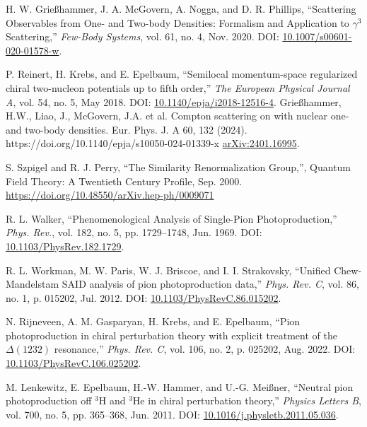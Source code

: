 \documentclass[a4paper,11pt]{article}
\begin{document}
\begin{thebibliography}{99}
  H. W. Grie{\ss}hammer, J. A. McGovern, A. Nogga, and D. R.
  Phillips, ``Scattering Observables from One- and Two-body
  Densities: Formalism and Application to $\gamma^3$ Scattering,''
  \textit{Few-Body Systems}, vol. 61, no. 4, Nov. 2020. DOI:
  \href{https://doi.org/10.1007/s00601-020-01578-w}{10.1007/s00601-020-01578-w}.

  P. Reinert, H. Krebs, and E. Epelbaum, ``Semilocal momentum-space
  regularized chiral two-nucleon potentials up to fifth order,''
  \textit{The European Physical Journal A}, vol. 54, no. 5, May 2018.
  DOI:
  \href{http://dx.doi.org/10.1140/epja/i2018-12516-4}{10.1140/epja/i2018-12516-4}.
Grießhammer, H.W., Liao, J., McGovern, J.A. et al. Compton scattering on 
 with nuclear one- and two-body densities. Eur. Phys. J. A 60, 132 (2024). https://doi.org/10.1140/epja/s10050-024-01339-x
\href{https://arxiv.org/abs/2401.16995}{arXiv:2401.16995}.

S. Szpigel and R. J. Perry, ``The Similarity Renormalization Group,'', Quantum Field Theory: A Twentieth Century Profile,
Sep. 2000. \href{https://doi.org/10.48550/arXiv.hep-ph/0009071}{https://doi.org/10.48550/arXiv.hep-ph/0009071}

R. L. Walker, ``Phenomenological Analysis of Single-Pion
Photoproduction,'' \textit{Phys. Rev.}, vol. 182, no. 5, pp.
1729--1748, Jun. 1969. DOI:
\href{https://link.aps.org/doi/10.1103/PhysRev.182.1729}{10.1103/PhysRev.182.1729}.

R. L. Workman, M. W. Paris, W. J. Briscoe, and I. I. Strakovsky,
``Unified Chew-Mandelstam SAID analysis of pion photoproduction
data,'' \textit{Phys. Rev. C}, vol. 86, no. 1, p. 015202, Jul.
2012. DOI:
\href{https://link.aps.org/doi/10.1103/PhysRevC.86.015202}{10.1103/PhysRevC.86.015202}.

N. Rijneveen, A. M. Gasparyan, H. Krebs, and E. Epelbaum, ``Pion photoproduction in chiral perturbation theory with explicit treatment of the $\Delta(1232)$ resonance,'' \textit{Phys. Rev. C}, vol. 106, no. 2, p. 025202, Aug. 2022. DOI: \href{https://link.aps.org/doi/10.1103/PhysRevC.106.025202}{10.1103/PhysRevC.106.025202}.

M. Lenkewitz, E. Epelbaum, H.-W. Hammer, and U.-G. Meißner,
``Neutral pion photoproduction off $^3$H and $^3$He in chiral
perturbation theory,'' \textit{Physics Letters B}, vol. 700, no. 5,
pp. 365–368, Jun. 2011. DOI:
\href{http://dx.doi.org/10.1016/j.physletb.2011.05.036}{10.1016/j.physletb.2011.05.036}.


\end{thebibliography}
\end{document}
